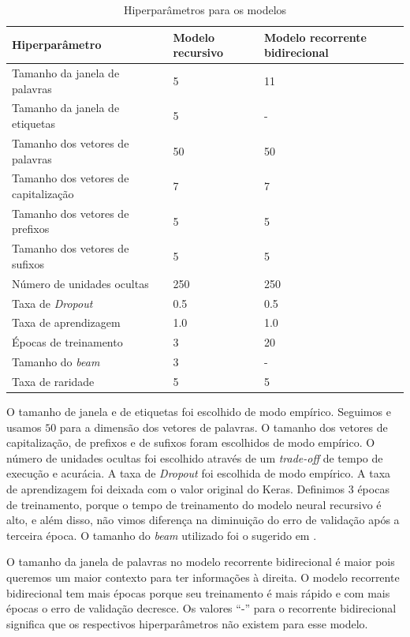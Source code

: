 \begin{table}[!htb]
\footnotesize
\centering
\caption{Hiperparâmetros para os modelos}
\label{tab:hiperparametrostab}
\begin{tabular}{m{6cm}P{4cm}P{4cm}}
  \toprule
  \textbf{Hiperparâmetro} & \textbf{Modelo recursivo} & \textbf{Modelo recorrente bidirecional}  \\
  \midrule
  Tamanho da janela de palavras  		& 5 & 11 \\
  Tamanho da janela de etiquetas     	& 5 & - \\
  Tamanho dos vetores de palavras  		& 50 & 50\\
  Tamanho dos vetores de capitalização 	& 7 & 7 \\
  Tamanho dos vetores de prefixos 		& 5 & 5 \\
  Tamanho dos vetores de sufixos 		& 5 & 5 \\
  Número de unidades ocultas 			& 250 & 250 \\
  Taxa de \textit{Dropout}			& 0.5 & 0.5 \\
  Taxa de aprendizagem 					& 1.0 & 1.0 \\
  Épocas de treinamento 				& 3 & 20 \\
  Tamanho do \textit{beam} 				& 3 & - \\
  Taxa de raridade						& 5 & 5 \\
  \bottomrule
\end{tabular}
\end{table}

O tamanho de janela e de etiquetas foi escolhido de modo empírico. Seguimos \cite{fonseca2015evaluating} e usamos $50$ para a dimensão dos vetores de palavras. O tamanho dos vetores de capitalização, de prefixos e de sufixos foram escolhidos de modo empírico. O número de unidades ocultas foi escolhido através de um \textit{trade-off} de tempo de execução e acurácia. A taxa de \textit{Dropout} foi escolhida de modo empírico. A taxa de aprendizagem foi deixada com o valor original do Keras. Definimos $3$ épocas de treinamento, porque o tempo de treinamento do modelo neural recursivo é alto, e além disso, não vimos diferença na diminuição do erro de validação após a terceira época. O tamanho do \textit{beam} utilizado foi o sugerido em \cite{shen2007guided}. 

O tamanho da janela de palavras no modelo recorrente bidirecional é maior pois queremos um maior contexto para ter informações à direita. O modelo recorrente bidirecional tem mais épocas porque seu treinamento é mais rápido e com mais épocas o erro de validação decresce. Os valores ``-'' para o recorrente bidirecional significa que os respectivos hiperparâmetros não existem para esse modelo.




